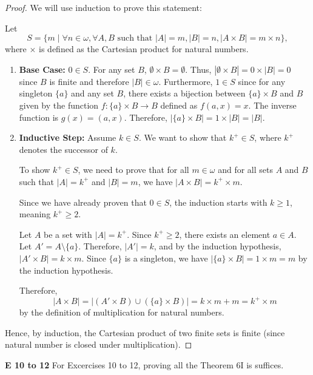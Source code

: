 \begin{proof}
    We will use induction to prove this statement:

    Let 
    \[
    S = \{ m \mid \forall n \in \omega, \forall A, B \text{ such that } |A| = m, |B| = n, |A \times B| = m \times n \},
    \]
    where \(\times\) is defined as the Cartesian product for natural numbers.

    \begin{enumerate}
        \item \textbf{Base Case:} \(0 \in S\). For any set \(B\), \(\emptyset \times B = \emptyset\). Thus, \(|\emptyset \times B| = 0 \times |B| = 0\) since \(B\) is finite and therefore \(|B| \in \omega\). Furthermore, \(1 \in S\) since for any singleton \(\{a\}\) and any set \(B\), there exists a bijection between \(\{a\} \times B\) and \(B\) given by the function \(f: \{a\} \times B \rightarrow B\) defined as \(f(a, x) = x\). The inverse function is \(g(x) = (a, x)\). Therefore, \(|\{a\} \times B| = 1 \times |B| = |B|\).
        
        \item \textbf{Inductive Step:} Assume \(k \in S\). We want to show that \(k^+ \in S\), where \(k^+\) denotes the successor of \(k\).
        
        To show \(k^+ \in S\), we need to prove that for all \(m \in \omega\) and for all sets \(A\) and \(B\) such that \(|A| = k^+\) and \(|B| = m\), we have \(|A \times B| = k^+ \times m\).
        
        Since we have already proven that \(0 \in S\), the induction starts with \(k \geq 1\), meaning \(k^+ \geq 2\).
        
        Let \(A\) be a set with \(|A| = k^+\). Since \(k^+ \geq 2\), there exists an element \(a \in A\). Let \(A' = A \setminus \{a\}\). Therefore, \(|A'| = k\), and by the induction hypothesis, \(|A' \times B| = k \times m\). Since \(\{a\}\) is a singleton, we have \(|\{a\} \times B| = 1 \times m = m\) by the induction hypothesis.
        
        Therefore,
        \[
        |A \times B| = |(A' \times B) \cup (\{a\} \times B)| = k \times m + m = k^+ \times m
        \]
        by the definition of multiplication for natural numbers.
    \end{enumerate}

    Hence, by induction, the Cartesian product of two finite sets is finite (since natural number is closed under multiplication).
\end{proof}
\begin{question}
    \textbf{E 10 to 12}
    For Excercises 10 to 12, proving all the Theorem 6I is suffices.
\end{question}
